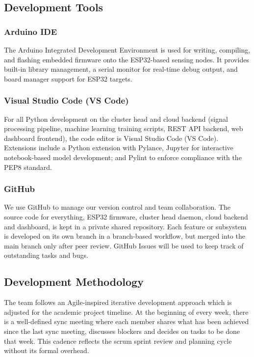 \documentclass[12pt,a4paper,oneside]{memoir}
\begin{document}
\subsection{Development Tools}
\label{sec:dev_tools}

\subsubsection{Arduino IDE}

The Arduino Integrated Development Environment is used for writing, compiling, and flashing embedded firmware onto the ESP32-based sensing nodes. It provides built-in library management, a serial monitor for real-time debug output, and board manager support for ESP32 targets.

\subsubsection{Visual Studio Code (VS Code)}

For all Python development on the cluster head and cloud backend (signal processing pipeline, machine learning training scripts, REST API backend, web dashboard frontend), the code editor is Visual Studio Code (VS Code). Extensions include a Python extension with Pylance, Jupyter for interactive notebook-based model development; and Pylint to enforce compliance with the PEP8 standard.

\subsubsection{GitHub}

We use GitHub to manage our version control and team collaboration. The source code for everything, ESP32 firmware, cluster head daemon, cloud backend and dashboard, is kept in a private shared repository. Each feature or subsystem is developed on its own branch in a branch-based workflow, but merged into the main branch only after peer review. GitHub Issues will be used to keep track of outstanding tasks and bugs.

\subsection{Development Methodology}
\label{sec:dev_methodology}

The team follows an Agile-inspired iterative development approach which is adjusted for the academic project timeline. At the beginning of every week, there is a well-defined sync meeting where each member shares what has been achieved since the last sync meeting, discusses blockers and decides on tasks to be done that week. This cadence reflects the scrum sprint review and planning cycle without its formal overhead.
\end{document}
